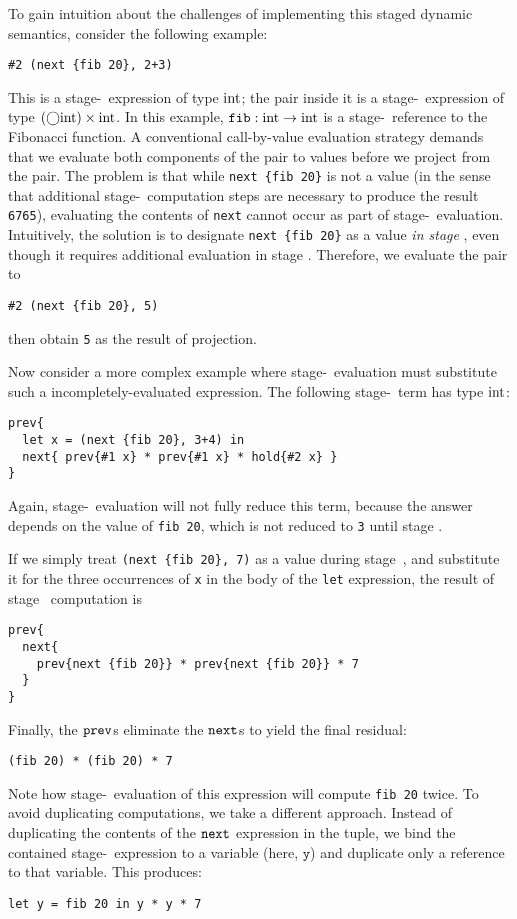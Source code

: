 To gain intuition about the challenges of implementing this staged dynamic
semantics, consider the following example:
\begin{lstlisting}
#2 (next {fib 20}, 2+3)
\end{lstlisting}
This is a stage-\bbone\ expression of type ${\rm int}$; the pair inside it is a
stage-\bbone\ expression of type $(\bigcirc{\rm int})\times{\rm int}$. 
In this example, ${\tt fib} : {\rm int} \to {\rm int}$ is a stage-\bbtwo\ reference to the Fibonacci function.
A conventional call-by-value evaluation strategy demands that we evaluate both components of
the pair to values before we project from the pair. The problem is that
while \verb|next {fib 20}| is not a value (in the sense that additional
stage-\bbtwo\ computation steps are necessary to produce the result \verb|6765|), 
evaluating the contents of \verb|next| cannot occur as part of stage-\bbone\ evaluation.
Intuitively, the solution is to designate \verb|next {fib 20}| as a value \emph{in
stage \bbone}, even though it requires additional evaluation in stage \bbtwo.
Therefore, we evaluate the pair to
\begin{lstlisting}
#2 (next {fib 20}, 5)
\end{lstlisting}
then obtain \verb|5| as the result of projection.

Now consider a more complex example where 
stage-\bbone\ evaluation must substitute such a incompletely-evaluated
expression. The following stage-\bbtwo\ term has type ${\rm int}$:
\begin{lstlisting} 
prev{
  let x = (next {fib 20}, 3+4) in
  next{ prev{#1 x} * prev{#1 x} * hold{#2 x} }
}
\end{lstlisting}
Again, stage-\bbone\ evaluation will not fully reduce this term, because the answer
depends on the value of \verb|fib 20|, which is not reduced to \verb|3| until
stage \bbtwo.

If we simply treat \verb|(next {fib 20}, 7)| as a value during stage~\bbone, and
substitute it for the three occurrences of \verb|x| in the body of the
\verb|let| expression, the result of stage \bbone\ computation is
\begin{lstlisting} 
prev{
  next{ 
    prev{next {fib 20}} * prev{next {fib 20}} * 7 
  }
}
\end{lstlisting}
Finally, the ${\tt prev}$s eliminate the ${\tt next}$s to yield the final residual:
\begin{lstlisting} 
(fib 20) * (fib 20) * 7
\end{lstlisting}
Note how stage-\bbtwo\ evaluation of this expression will compute \verb|fib 20| twice.  
To avoid duplicating computations, we take a different approach.  Instead of
duplicating the contents of the ${\tt next}$ expression in the tuple, we bind the contained stage-\bbtwo\ expression to
a variable (here, $\mathtt{y}$) and duplicate only a reference to that variable.
This produces:
\begin{lstlisting} 
let y = fib 20 in y * y * 7
\end{lstlisting}

